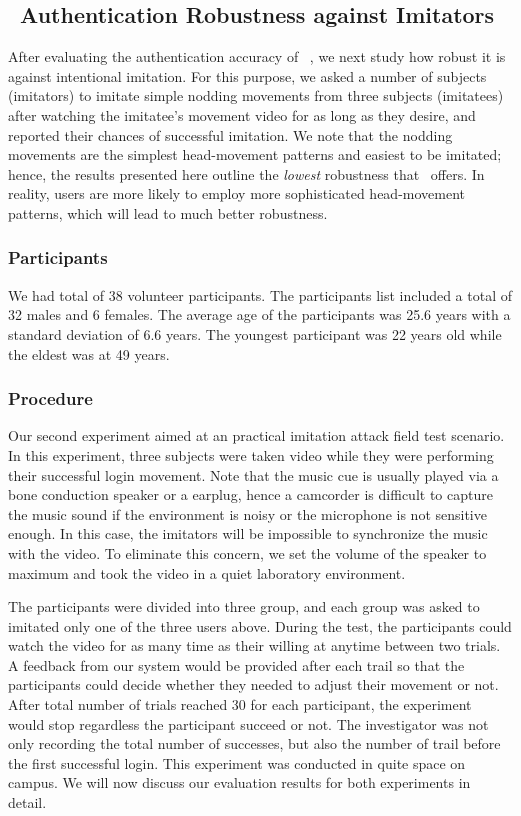 
\subsection{\systemname~Authentication Robustness against Imitators} After evaluating the authentication accuracy of \systemname~, we next study how robust it is against intentional imitation. For this purpose, we asked a number of subjects (imitators) to imitate simple nodding movements from three subjects (imitatees) after watching the imitatee's movement video for as long as they desire, and reported their chances of successful imitation. We note that the nodding movements are the simplest head-movement patterns and easiest to be imitated; hence, the results presented here outline the \emph{lowest} robustness that \systemname~offers. In reality, users are more likely to employ more sophisticated head-movement patterns, which will lead to much better robustness.

\subsubsection{Participants}
We had total of 38 volunteer participants. The participants list included a total of 32 males and 6 females.
The average age of the participants was 25.6 years with a standard deviation
of 6.6 years. The youngest participant was 22 years old while the eldest was
at 49 years.
\subsubsection{Procedure}
Our second experiment aimed at an practical imitation attack field test scenario. In this experiment, three subjects were taken video while they were performing their successful login movement. Note that the music cue is usually played via a bone conduction speaker or a earplug, hence a camcorder is difficult to capture the music sound if the environment is noisy or the microphone is not sensitive enough. In this case, the imitators will be impossible to synchronize the music with the video. To eliminate this concern, we set the volume of the speaker to maximum and took the video in a quiet laboratory environment.

The participants were divided into three group, and each group was asked to imitated only one of the three users above. During the test, the participants could watch the video for as many time as their willing at anytime between two trials. A feedback from our system would be provided after each trail so that the participants could decide whether they needed to adjust their movement or not. After total number of trials reached 30 for each participant, the experiment would stop regardless the participant succeed or not. The investigator was not only recording the total number of successes, but also the number of trail before the first successful login. This experiment was conducted in quite space on campus. We will now discuss our evaluation results for both experiments in detail.

